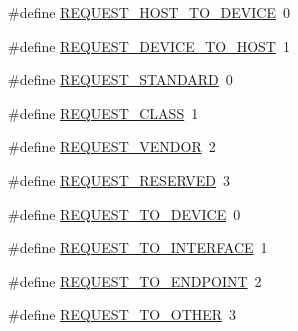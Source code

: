\begin{DoxyCompactItemize}
\item 
\#define \hyperlink{group___u_s_b_d___core_ga8d90abb0515c0c9cd7c80480f1ebe7d3}{R\+E\+Q\+U\+E\+S\+T\+\_\+\+H\+O\+S\+T\+\_\+\+T\+O\+\_\+\+D\+E\+V\+I\+CE}~0
\item 
\#define \hyperlink{group___u_s_b_d___core_gaf8f8eae5ae324d7d3e1344e97e23b20f}{R\+E\+Q\+U\+E\+S\+T\+\_\+\+D\+E\+V\+I\+C\+E\+\_\+\+T\+O\+\_\+\+H\+O\+ST}~1
\end{DoxyCompactItemize}
\begin{DoxyCompactItemize}
\item 
\#define \hyperlink{group___u_s_b_d___core_ga1dd6ef57678e7af95d835049d5b355b9}{R\+E\+Q\+U\+E\+S\+T\+\_\+\+S\+T\+A\+N\+D\+A\+RD}~0
\item 
\#define \hyperlink{group___u_s_b_d___core_gafd24e03239e2df9e6d9c6cbcd53c1337}{R\+E\+Q\+U\+E\+S\+T\+\_\+\+C\+L\+A\+SS}~1
\item 
\#define \hyperlink{group___u_s_b_d___core_ga40131e4daec200a7d931c2b26e43d27f}{R\+E\+Q\+U\+E\+S\+T\+\_\+\+V\+E\+N\+D\+OR}~2
\item 
\#define \hyperlink{group___u_s_b_d___core_ga63cb1192a7cd205455bddd302f67c915}{R\+E\+Q\+U\+E\+S\+T\+\_\+\+R\+E\+S\+E\+R\+V\+ED}~3
\end{DoxyCompactItemize}
\begin{DoxyCompactItemize}
\item 
\#define \hyperlink{group___u_s_b_d___core_gaf89871a0b4aa9411e09a9961de76e76f}{R\+E\+Q\+U\+E\+S\+T\+\_\+\+T\+O\+\_\+\+D\+E\+V\+I\+CE}~0
\item 
\#define \hyperlink{group___u_s_b_d___core_ga0e5e473281fc9c1ee1ea446823c02623}{R\+E\+Q\+U\+E\+S\+T\+\_\+\+T\+O\+\_\+\+I\+N\+T\+E\+R\+F\+A\+CE}~1
\item 
\#define \hyperlink{group___u_s_b_d___core_ga4c4571ca0bf6b462bd8954a95456561c}{R\+E\+Q\+U\+E\+S\+T\+\_\+\+T\+O\+\_\+\+E\+N\+D\+P\+O\+I\+NT}~2
\item 
\#define \hyperlink{group___u_s_b_d___core_gad1f005d9ae04da7324d465a86e489af5}{R\+E\+Q\+U\+E\+S\+T\+\_\+\+T\+O\+\_\+\+O\+T\+H\+ER}~3
\end{DoxyCompactItemize}
